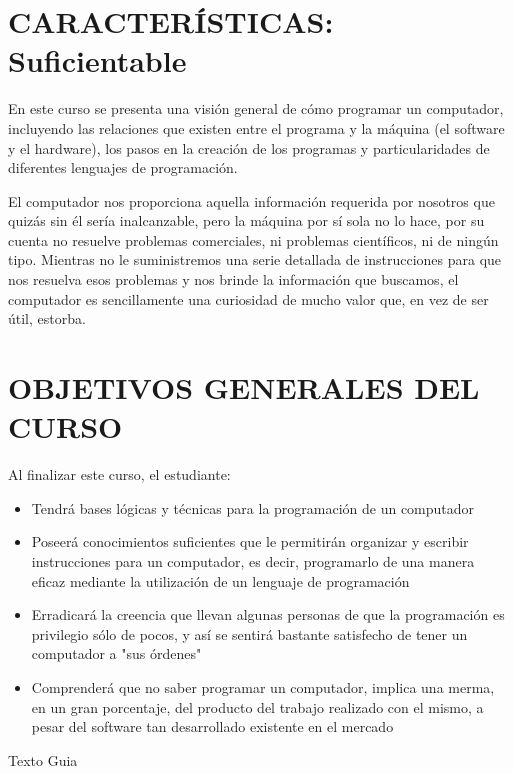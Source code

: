 

\section{CARACTERÍSTICAS: Suficientable}

En este curso se presenta una visión general de cómo programar un computador, incluyendo las relaciones que existen entre el programa y la máquina (el software y el hardware), los pasos en la creación de los programas y particularidades de diferentes lenguajes de programación.

El computador nos proporciona aquella información requerida por nosotros que quizás sin él sería inalcanzable, pero la máquina por sí sola no lo hace, por su cuenta no resuelve problemas comerciales, ni problemas científicos, ni de ningún tipo. Mientras no le suministremos una serie detallada de instrucciones para que nos resuelva esos problemas y nos brinde la información que buscamos, el computador es sencillamente una curiosidad de mucho valor que, en vez de ser útil, estorba.

\section{OBJETIVOS GENERALES DEL CURSO}

Al finalizar este curso, el estudiante:

\begin{itemize}
	\item Tendrá bases lógicas y técnicas para la programación de un computador 

	\item Poseerá conocimientos suficientes que le permitirán organizar y escribir instrucciones para un computador, es decir, programarlo de una manera eficaz mediante la utilización de un lenguaje de programación

	\item Erradicará la creencia que llevan algunas personas de que la programación es privilegio sólo de pocos, y así se sentirá bastante satisfecho de tener un computador a "sus órdenes"

	\item Comprenderá que no saber programar un computador, implica una merma, en un gran porcentaje, del producto del trabajo realizado con el mismo, a pesar del software tan desarrollado existente en el mercado
\end{itemize}

Texto Guia \cite{farrell2011programming}


